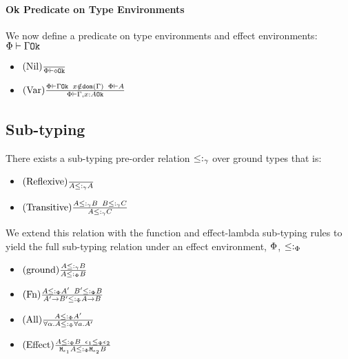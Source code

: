 {\paragraph{Ok Predicate on Type Environments}
We now define a predicate on type environments and effect environments: $\oke{\P}{\G}$

\begin{itemize}
    \item $\treerule{Nil}{}{\oke{\P}{\nil}}$
    \item $\treerule{Var}{\oke{\P}{\G}\s\s x\notin\dom{\G}\s\s \wellformed{\P}{A}}{\oke{\P}{\gax}}$
\end{itemize}



\subsection{Sub-typing}
    There exists a sub-typing pre-order relation $\subtype_{\ground}$ over ground types that is:
    \begin{itemize}
        \item $\treerule{Reflexive}{}{A \subtype_{\ground} A}$
        \item $\treerule{Transitive}{A \subtype_{\ground} B \s \s B \subtype_{\ground} C}{A \subtype_{\ground} C}$
    \end{itemize}

    We extend this relation with the function and effect-lambda sub-typing rules to yield the full sub-typing relation under an effect environment, $\P$, $\subtypep$

    \begin{itemize}
        \item $\treerule{ground}{A \subtype_{\ground} B}{A \subtypep B}$
        \item $\treerule{Fn}{A \subtypep A' \s\s B' \subtypep B }{\fntype{A'}{B'} \subtypep \ab}$
        \item $\treerule{All}{A\subtypep A'}{\all{\a}{A}\subtypep\all{a}{A'}}$
        \item $\treerule{Effect}{A\subtypep B\s\s \e_1\subeffectp\e_2}{\M{\e_1}{A}\subtypep\M{\e_2}{B}}$
    \end{itemize}

}
